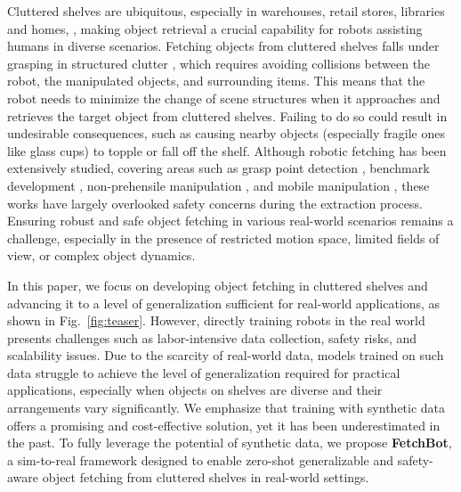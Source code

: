 Cluttered shelves are ubiquitous, especially in warehouses, retail stores, libraries and homes, \etcno, making object retrieval a crucial capability for robots assisting humans in diverse scenarios.
Fetching objects from cluttered shelves falls under grasping in structured clutter \cite{lundell2021ddgc}, which requires avoiding collisions between the robot, the manipulated objects, and surrounding items.
This means that the robot needs to minimize the change of scene structures when it approaches and retrieves the target object from cluttered shelves. Failing to do so could result in undesirable consequences, such as causing nearby objects (especially fragile ones like glass cups) to topple or fall off the shelf. Although robotic fetching has been extensively studied, covering areas such as grasp point detection \cite{yang2023dynamo,atar2024optigrasp,murray2024learning}, benchmark development \cite{han2024fetchbench}, non-prehensile manipulation \cite{wu2024wild}, and mobile manipulation \cite{bajracharya2024demonstrating,spahn2024demonstrating}, these works have largely overlooked safety concerns during the extraction process. Ensuring robust and safe object fetching in various real-world scenarios remains a challenge, especially in the presence of restricted motion space, limited fields of view, or complex object dynamics.

In this paper, we focus on developing object fetching in cluttered shelves and advancing it to a level of generalization sufficient for real-world applications, as shown in Fig.~\ref{fig:teaser}.
However, directly training robots in the real world presents challenges such as labor-intensive data collection, safety risks, and scalability issues. Due to the scarcity of real-world data, models trained on such data struggle to achieve the level of generalization required for practical applications, especially when objects on shelves are diverse and their arrangements vary significantly.
We emphasize that training with synthetic data offers a promising and cost-effective solution, yet it has been underestimated in the past.
To fully leverage the potential of synthetic data, we propose \textbf{FetchBot}, a sim-to-real framework designed to enable zero-shot generalizable and safety-aware object fetching from cluttered shelves in real-world settings.

